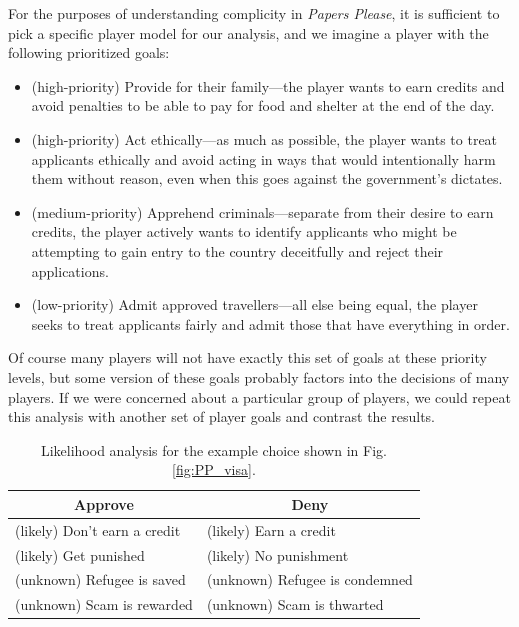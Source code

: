 \documentclass[arts,article,submit,moreauthors,pdftex,10pt,a4paper]{Definitions/mdpi}
\begin{document}
For the purposes of understanding complicity in \emph{Papers Please}, it is sufficient to pick a specific player model for our analysis, and we imagine a player with the following prioritized goals:
\begin{itemize}
  \item (high-priority) Provide for their family---the player wants to earn credits and avoid penalties to be able to pay for food and shelter at the end of the day.
  \item (high-priority) Act ethically---as much as possible, the player wants to treat applicants ethically and avoid acting in ways that would intentionally harm them without reason, even when this goes against the government's dictates.
  \item (medium-priority) Apprehend criminals---separate from their desire to earn credits, the player actively wants to identify applicants who might be attempting to gain entry to the country deceitfully and reject their applications.
  \item (low-priority) Admit approved travellers---all else being equal, the player seeks to treat applicants fairly and admit those that have everything in order.
\end{itemize}
Of course many players will not have exactly this set of goals at these priority levels, but some version of these goals probably factors into the decisions of many players.
%
If we were concerned about a particular group of players, we could repeat this analysis with another set of player goals and contrast the results.


\begin{table}[H]
\centering
\begin{tabular}{l l}
  \toprule
  \multicolumn{1}{c}{\textbf{Approve}} & \multicolumn{1}{c}{\textbf{Deny}} \\
  \midrule
  (likely) Don't earn a credit & (likely) Earn a credit \\
  (likely) Get punished & (likely) No punishment \\
  (unknown) Refugee is saved & (unknown) Refugee is condemned \\
  (unknown) Scam is rewarded & (unknown) Scam is thwarted \\
  \bottomrule
\end{tabular}
\caption[Example likelihood analysis]{Likelihood analysis for the example choice shown in Fig. \ref{fig:PP_visa}.}
\label{tab:likelihoods}
\end{table}
\end{document}
